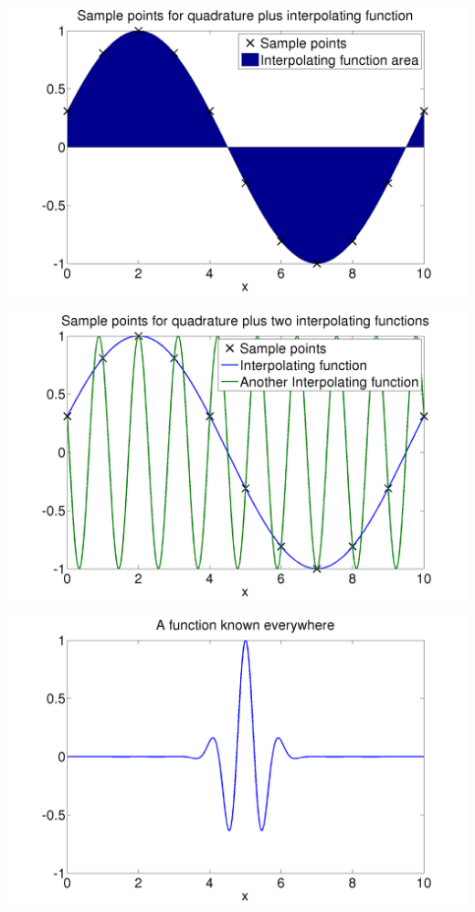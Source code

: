 \documentclass{beamer}
\begin{document}
\begin{frame}
\begin{columns}
\begin{column}{0.5\textwidth}
\begin{overlayarea}{\textwidth}{0.6\textheight}
{\begin{center}
            \includegraphics[width=\textwidth]{figures/QuadAliasing3}
          \end{center}
        }
        {
          \begin{center}
            \includegraphics[width=\textwidth]{figures/QuadAliasing4}
          \end{center}
        }
        {
          \begin{center}
            \includegraphics[width=\textwidth]{figures/QuadAdaptive1}

\end{center}}
\end{overlayarea}
\end{column}
\end{columns}
\end{frame}
\end{document}
